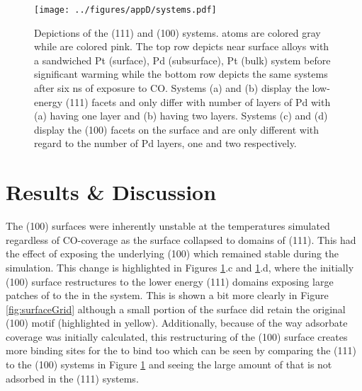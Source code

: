\begin{landscape}
\begin{figure}[p!]
\centering
  \texttt{[image: ../figures/appD/systems.pdf]}
  \caption{Depictions of the (111) and (100) systems.  atoms are colored
gray while  are colored pink. The top row depicts near surface alloys
with a sandwiched Pt (surface), Pd (subsurface), Pt (bulk) system before
significant warming while the bottom row depicts the same systems after six ns of
exposure to CO. Systems (a) and (b) display the low-energy (111) facets and
only differ with number of layers of Pd with (a) having one layer and (b)
having two layers. Systems (c) and (d) display the (100) facets on the surface
and are only different with regard to the number of Pd layers, one and two
respectively.}
\label{fig:biSystems}
\end{figure}
\end{landscape}

\section{Results \& Discussion}
The (100)  surfaces were inherently unstable at the temperatures
simulated regardless of CO-coverage as the surface  collapsed to domains
of (111). This had the effect of exposing the underlying (100)  which
remained stable during the simulation. This change is highlighted in Figures
\ref{fig:biSystems}.c and \ref{fig:biSystems}.d, where the initially (100)
surface restructures to the lower energy (111) domains exposing large patches
of  to the  in the system. This is shown a bit more clearly in
Figure \ref{fig:surfaceGrid} although a small portion of the surface did retain
the original (100) motif (highlighted in yellow). Additionally, because of the
way adsorbate coverage was initially calculated, this restructuring of the
(100) surface creates more binding sites for the  to bind too which can
be seen by comparing the (111) to the (100) systems in Figure
\ref{fig:biSystems} and seeing the large amount of  that is not adsorbed
in the (111) systems.

